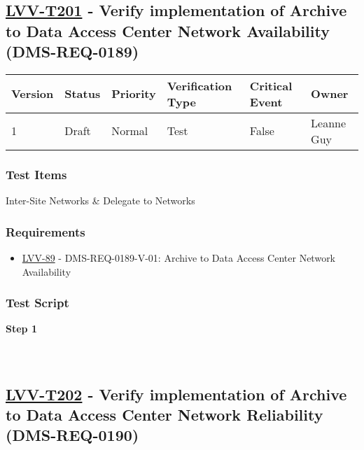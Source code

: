 \hypertarget{lvv-t201---verify-implementation-of-archive-to-data-access-center-network-availability-dms-req-0189}{%
\subsection{\texorpdfstring{\href{https://jira.lsstcorp.org/secure/Tests.jspa\#/testCase/LVV-T201}{LVV-T201}
- Verify implementation of Archive to Data Access Center Network
Availability
(DMS-REQ-0189)}{LVV-T201 - Verify implementation of Archive to Data Access Center Network Availability (DMS-REQ-0189)}}\label{lvv-t201---verify-implementation-of-archive-to-data-access-center-network-availability-dms-req-0189}}

\begin{longtable}[]{@{}llllll@{}}
\toprule
Version & Status & Priority & Verification Type & Critical Event &
Owner\tabularnewline
\midrule
\endhead
1 & Draft & Normal & Test & False & Leanne Guy\tabularnewline
\bottomrule
\end{longtable}

\hypertarget{test-items-177}{%
\subsubsection{Test Items}\label{test-items-177}}

Inter-Site Networks \& Delegate to Networks

\hypertarget{requirements-178}{%
\subsubsection{Requirements}\label{requirements-178}}

\begin{itemize}
\tightlist
\item
  \href{https://jira.lsstcorp.org/browse/LVV-89}{LVV-89} -
  DMS-REQ-0189-V-01: Archive to Data Access Center Network Availability
\end{itemize}

\hypertarget{test-script-178}{%
\subsubsection{Test Script}\label{test-script-178}}

\textbf{Step 1}\\
~\\
~\\

\hypertarget{lvv-t202---verify-implementation-of-archive-to-data-access-center-network-reliability-dms-req-0190}{%
\subsection{\texorpdfstring{\href{https://jira.lsstcorp.org/secure/Tests.jspa\#/testCase/LVV-T202}{LVV-T202}
- Verify implementation of Archive to Data Access Center Network
Reliability
(DMS-REQ-0190)}{LVV-T202 - Verify implementation of Archive to Data Access Center Network Reliability (DMS-REQ-0190)}}\label{lvv-t202---verify-implementation-of-archive-to-data-access-center-network-reliability-dms-req-0190}}

